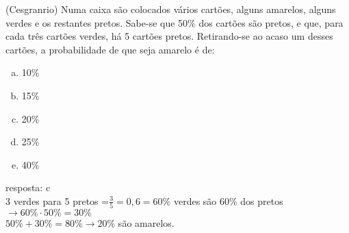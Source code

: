 \begin{ex}
(Cesgranrio) Numa caixa são colocados vários cartões, alguns amarelos, alguns verdes e os restantes pretos. Sabe-se que 50\% dos cartões são pretos, e que, para cada três cartões verdes, há 5 cartões pretos. Retirando-se ao acaso um desses cartões, a probabilidade de que seja amarelo é de:
   \begin{enumerate}[(a)]
   \item 10\%
   \item 15\%
   \item 20\% 
   \item 25\%
   \item 40\%
   \end{enumerate}
     \begin{sol}
      resposta: c \\
      3 verdes para 5 pretos =$\frac{3}{5}=0,6=60\%$ \hspace{0,4cm}
      verdes são 60\% dos pretos $\rightarrow  60\%\cdot50\%=30\%$\\
      $50\%+30\%=80\% \longrightarrow 20\% $ são amarelos.
     \end{sol}
\end{ex}